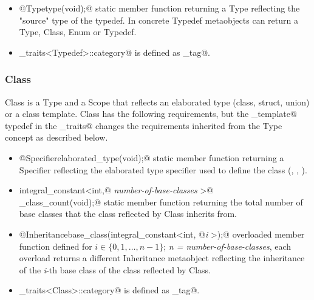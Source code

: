 \begin{itemize}
	\item{\verb@static @{\metaobject Type}\verb@ type(void);@} static member function
	returning a {\metaobject Type} reflecting the "source" type of the typedef.
	In concrete {\metaobject Typedef} metaobjects \verb@type@ can return a 
	{\metaobject Type}, {\metaobject Class}, {\metaobject Enum} or {\metaobject Typedef}.

	\item \verb@metaobject_traits<Typedef>::category@ is defined as \verb@typedef_tag@.
\end{itemize}

\subsubsection{Class}

{\metaobject Class} is a {\metaobject Type} and a {\metaobject Scope} that reflects
an elaborated type (class, struct, union) or a class template.
{\metaobject Class} has the following requirements, but
the \verb@is_template@ typedef in the \verb@metaobject_traits@ changes the requirements
inherited from the {\metaobject Type} concept as described below.

\begin{itemize}
	\item{\verb@static @{\metaobject Specifier}\verb@ elaborated_type(void);@}
	static member function returning a {\metaobject Specifier} reflecting the elaborated
	type specifier used to define the class (\verb@class@, \verb@struct@, \verb@union@).

	\item{\verb@static integral_constant<int,@ {\em number-of-base-classes}
	\verb@>@\\\verb@base_class_count(void);@} static member function returning the total number
	of base classes that the class reflected by {\metaobject Class} inherits from.

	\item{\verb@static @{\metaobject Inheritance}\verb@ base_class(integral_constant<int, @{\em i}
	\verb@>);@} overloaded member function defined
	for $i \in \{0, 1, \dots, n-1\}$; {\em n = number-of-base-classes},
	each overload returns a different {\metaobject Inheritance} metaobject reflecting the inheritance
	of the {\em i}-th base class of the class reflected by {\metaobject Class}.

	\item \verb@metaobject_traits<Class>::category@ is defined as \verb@class_tag@.
\end{itemize}

